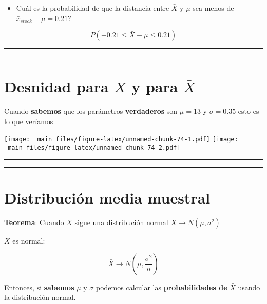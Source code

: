 \documentclass[
]{book}
\providecommand{\tightlist}{%
  \setlength{\itemsep}{0pt}\setlength{\parskip}{0pt}}
\begin{document}
\begin{itemize}
\tightlist
\item
  Cuál es la probabilidad de que la distancia entre \(\bar{X}\) y \(\mu\) sea menos de \(\bar{x}_{stock}-\mu=0.21\)?
\end{itemize}

\[P(- 0.21\leq \bar{X}-\mu \leq 0.21)\]

\begin{center}\rule{0.5\linewidth}{0.5pt}\end{center}

\begin{center}\rule{0.5\linewidth}{0.5pt}\end{center}

\hypertarget{desnidad-para-x-y-para-barx}{%
\section{\texorpdfstring{Desnidad para \(X\) y para \(\bar{X}\)}{Desnidad para X y para \textbackslash bar\{X\}}}\label{desnidad-para-x-y-para-barx}}

Cuando \textbf{sabemos} que los parámetros \textbf{verdaderos} son \(\mu=13\) y \(\sigma=0.35\) esto es lo que veríamos

\texttt{[image: \_main\_files/figure-latex/unnamed-chunk-74-1.pdf]} \texttt{[image: \_main\_files/figure-latex/unnamed-chunk-74-2.pdf]}

\begin{center}\rule{0.5\linewidth}{0.5pt}\end{center}

\begin{center}\rule{0.5\linewidth}{0.5pt}\end{center}

\hypertarget{distribuciuxf3n-media-muestral}{%
\section{Distribución media muestral}\label{distribuciuxf3n-media-muestral}}

\textbf{Teorema}: Cuando \(X\) sigue una distribución normal \(X \rightarrow N(\mu, \sigma^2)\)

\(\bar{X}\) es normal:

\[\bar{X} \rightarrow N(\mu, \frac{\sigma^2}{n})\]

Entonces, si \textbf{sabemos} \(\mu\) y \(\sigma\) podemos calcular las \textbf{probabilidades de} \(\bar{X}\) usando la distribución normal.
\end{document}
